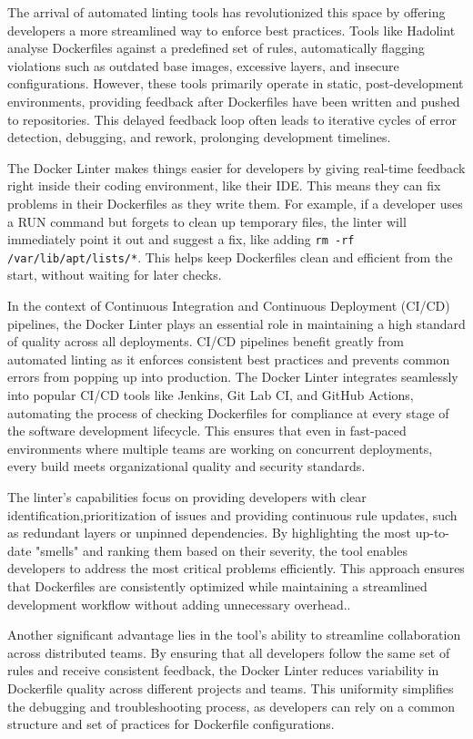 The arrival of automated linting tools has revolutionized this space by offering developers a more streamlined way to enforce best practices. Tools like Hadolint analyse Dockerfiles against a predefined set of rules, automatically flagging violations such as outdated base images, excessive layers, and insecure configurations. However, these tools primarily operate in static, post-development environments, providing feedback after Dockerfiles have been written and pushed to repositories. This delayed feedback loop often leads to iterative cycles of error detection, debugging, and rework, prolonging development timelines.

The Docker Linter makes things easier for developers by giving real-time feedback right inside their coding environment, like their IDE. This means they can fix problems in their Dockerfiles as they write them. For example, if a developer uses a RUN command but forgets to clean up temporary files, the linter will immediately point it out and suggest a fix, like adding \verb|rm -rf /var/lib/apt/lists/*|. This helps keep Dockerfiles clean and efficient from the start, without waiting for later checks.

In the context of Continuous Integration and Continuous Deployment (CI/CD) pipelines, the Docker Linter plays an essential role in maintaining a high standard of quality across all deployments. CI/CD pipelines benefit greatly from automated linting as it enforces consistent best practices and prevents common errors from popping up into production. The Docker Linter integrates seamlessly into popular CI/CD tools like Jenkins, Git Lab CI, and GitHub Actions, automating the process of checking Dockerfiles for compliance at every stage of the software development lifecycle. This ensures that even in fast-paced environments where multiple teams are working on concurrent deployments, every build meets organizational quality and security standards.\cite{2022continuous}

The linter’s capabilities focus on providing developers with clear identification,prioritization of issues and providing continuous rule updates, such as redundant layers or unpinned dependencies. By highlighting the most up-to-date "smells" and ranking them based on their severity, the tool enables developers to address the most critical problems efficiently. This approach ensures that Dockerfiles are consistently optimized while maintaining a streamlined development workflow without adding unnecessary overhead..

Another significant advantage lies in the tool’s ability to streamline collaboration across distributed teams. By ensuring that all developers follow the same set of rules and receive consistent feedback, the Docker Linter reduces variability in Dockerfile quality across different projects and teams. This uniformity simplifies the debugging and troubleshooting process, as developers can rely on a common structure and set of practices for Dockerfile configurations.

